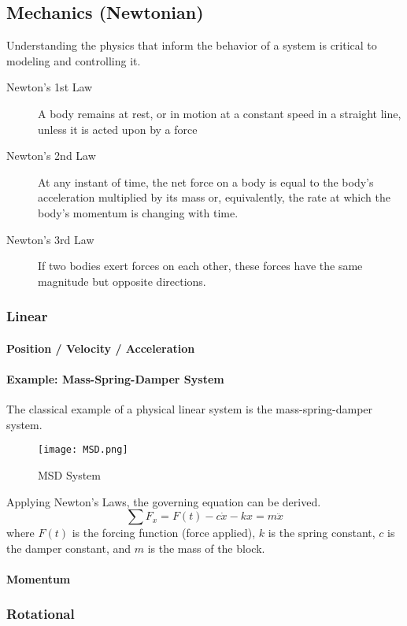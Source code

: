 \documentclass[../notes.tex]{subfiles}
\begin{document}
\subsection{Mechanics (Newtonian)}
Understanding the physics that inform the behavior of a system is critical to modeling and controlling it.
\begin{description}
    \item[Newton's 1st Law] A body remains at rest, or in motion at a constant speed in a straight line, unless it is acted upon by a force
    \item[Newton's 2nd Law] At any instant of time, the net force on a body is equal to the body's acceleration multiplied by its mass or, equivalently, the rate at which the body's momentum is changing with time.
    \item[Newton's 3rd Law] If two bodies exert forces on each other, these forces have the same magnitude but opposite directions.
\end{description}
\subsubsection{Linear}
\paragraph{Position / Velocity / Acceleration}
\paragraph{Example: Mass-Spring-Damper System}
The classical example of a physical linear system is the mass-spring-damper system.
\begin{figure}[H]
    \centering
    \texttt{[image: MSD.png]}
    \caption{MSD System}
    \label{fig:MSD}
\end{figure}
Applying Newton's Laws, the governing equation can be derived.
\begin{equation}
    \sum F_x = F(t) - c\dot{x} - kx = m\ddot{x}
\end{equation}
where $F(t)$ is the forcing function (force applied), $k$ is the spring constant, $c$ is the damper constant, and $m$ is the mass of the block.

\paragraph{Momentum}
\subsubsection{Rotational}
\end{document}
